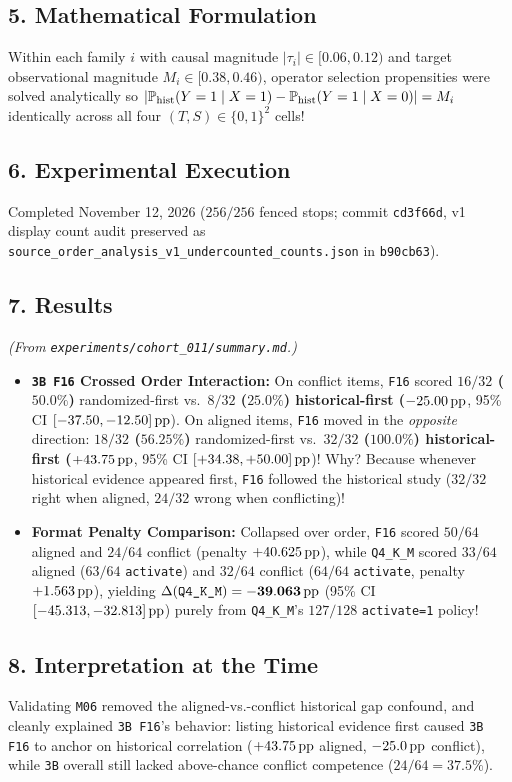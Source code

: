 \subsection*{5. Mathematical Formulation}
Within each family $i$ with causal magnitude $|\tau_i| \in [0.06, 0.12)$ and target observational magnitude $M_i \in [0.38, 0.46)$, operator selection propensities were solved analytically so $|\mathbb{P}_{\mathrm{hist}}(Y=1\mid X=1) - \mathbb{P}_{\mathrm{hist}}(Y=1\mid X=0)| = M_i$ identically across all four $(T,S) \in \{0,1\}^2$ cells!

\subsection*{6. Experimental Execution}
Completed November 12, 2026 ($256/256$ fenced stops; commit \texttt{cd3f66d}, v1 display count audit preserved as \texttt{source\_order\_analysis\_v1\_undercounted\_counts.json} in \texttt{b90cb63}).

\subsection*{7. Results}
\emph{(From \texttt{experiments/cohort\_011/summary.md}.)}
\begin{itemize}
  \item \textbf{\texttt{3B F16} Crossed Order Interaction:} On conflict items, \texttt{F16} scored \textbf{$16/32$ ($50.0\%$)} randomized-first vs.\ \textbf{$8/32$ ($25.0\%$)\textbf{ historical-first (}$-25.00\,\mathrm{pp}$}, 95\% CI $[-37.50, -12.50]\,\mathrm{pp}$). On aligned items, \texttt{F16} moved in the \emph{opposite} direction: \textbf{$18/32$ ($56.25\%$)} randomized-first vs.\ \textbf{$32/32$ ($100.0\%$)\textbf{ historical-first (}$+43.75\,\mathrm{pp}$}, 95\% CI $[+34.38, +50.00]\,\mathrm{pp}$)! Why? Because whenever historical evidence appeared first, \texttt{F16} followed the historical study ($32/32$ right when aligned, $24/32$ wrong when conflicting)!
  \item \textbf{Format Penalty Comparison:} Collapsed over order, \texttt{F16} scored $50/64$ aligned and $24/64$ conflict (penalty $+40.625\,\mathrm{pp}$), while \texttt{Q4\_K\_M} scored $33/64$ aligned ($63/64$ \texttt{activate}) and $32/64$ conflict ($64/64$ \texttt{activate}, penalty $+1.563\,\mathrm{pp}$), yielding $\Delta(\text{\texttt{Q4\_K\_M}}) = \mathbf{-39.063\,\mathrm{pp}}$ (95\% CI $[-45.313, -32.813]\,\mathrm{pp}$) purely from \texttt{Q4\_K\_M}'s $127/128$ \texttt{activate=1} policy!
\end{itemize}

\subsection*{8. Interpretation at the Time}
Validating \texttt{M06} removed the aligned-vs.-conflict historical gap confound, and cleanly explained \texttt{3B F16}'s behavior: listing historical evidence first caused \texttt{3B F16} to anchor on historical correlation ($+43.75\,\mathrm{pp}$ aligned, $-25.0\,\mathrm{pp}$ conflict), while \texttt{3B} overall still lacked above-chance conflict competence ($24/64 = 37.5\%$).


